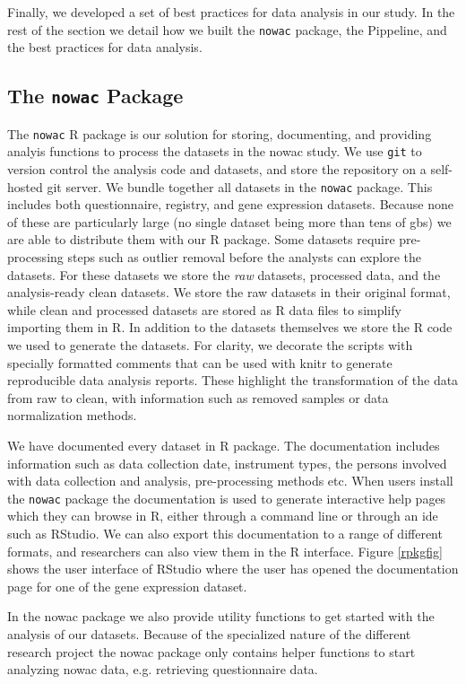 Finally, we developed a set of best practices for data analysis in our study. In
the rest of the section we detail how we built the \texttt{nowac} package, the
Pippeline, and the best practices for data analysis. 

\subsection{The \texttt{nowac} Package} 
The \texttt{nowac} R package is our solution for storing, documenting, and
providing analyis functions to process the datasets in the \gls{nowac} study. We
use \texttt{git} to version control the analysis code and datasets, and store
the repository on a self-hosted git server.  We bundle together all datasets in
the \texttt{nowac} package. This includes both questionnaire, registry, and gene
expression datasets. Because none of these are particularly large (no single
dataset being more than tens of \glspl{gb}) we are able to distribute them with
our R package. Some datasets require pre-processing steps such as outlier
removal before the analysts can explore the datasets. For these datasets we
store the \emph{raw} datasets, processed data, and the analysis-ready clean
datasets. We store the raw datasets in their original format, while clean and
processed datasets are stored as R data files to simplify importing them in R.
In addition to the datasets themselves we store the R code we used to generate
the datasets.  For clarity, we decorate the scripts with specially formatted
comments that can be used with knitr\cite{xie2016dynamic} to generate
reproducible data analysis reports. These highlight the transformation of the
data from raw to clean, with information such as removed samples or data
normalization methods. 

We have documented every dataset in R package. The documentation includes
information such as data collection date, instrument types, the persons involved
with data collection and analysis, pre-processing methods etc.  When users
install the \texttt{nowac} package the documentation is used to generate
interactive help pages which they can browse in R, either through a command line
or through an \gls{ide} such as RStudio.  We can also export this documentation
to a range of different formats, and researchers can also view them in the R
interface. Figure \ref{rpkgfig} shows the user interface of RStudio where the
user has opened the documentation page for one of the gene expression dataset. 

In the \gls{nowac} package we also provide utility functions to get started with
the analysis of our datasets. Because of the specialized nature of the different
research project the \gls{nowac} package only contains helper functions to start
analyzing \gls{nowac} data, e.g. retrieving questionnaire data. 

